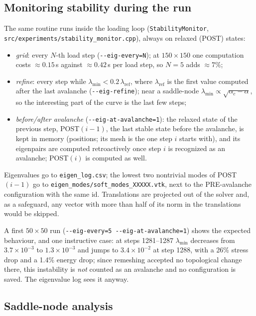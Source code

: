 \documentclass[11pt,a4paper]{article}
\theoremstyle{remark}
\newcommand{\code}[1]{\texttt{#1}}
\begin{document}
\subsection{Monitoring stability during the run}

The same routine runs inside the loading loop (\code{StabilityMonitor},
\code{src/\allowbreak{}experiments/\allowbreak{}stability\_\allowbreak{}monitor.cpp}), always on relaxed (POST) states:
\begin{itemize}[leftmargin=*]
\item \emph{grid}: every $N$-th load step (\code{-{}-eig-every=N}); at $150\times150$ one computation
costs $\approx0.15$\,s against $\approx0.42$\,s per load step, so $N=5$ adds $\approx7\%$;
\item \emph{refine}: every step while $\lambda_{\min}<0.2\,\lambda_{\mathrm{ref}}$, where
$\lambda_{\mathrm{ref}}$ is the first value computed after the last avalanche
(\code{-{}-eig-refine}); near a saddle-node $\lambda_{\min}\propto\sqrt{\alpha_c-\alpha}$, so the
interesting part of the curve is the last few steps;
\item \emph{before/after avalanche} (\code{-{}-eig-at-avalanche=1}): the relaxed state of the
previous step, POST$(i-1)$, the last stable state before the avalanche, is kept in memory
(positions; its mesh is the one step $i$ starts with), and its eigenpairs are computed
retroactively once step $i$ is recognized as an avalanche; POST$(i)$ is computed as well.
\end{itemize}
Eigenvalues go to \code{eigen\_\allowbreak{}log.csv}; the lowest two nontrivial modes of POST$(i-1)$
go to \code{eigen\_\allowbreak{}modes/\allowbreak{}soft\_\allowbreak{}modes\_XXXXX.vtk}, next to the PRE-avalanche
configuration with the same id. Translations are projected out of the solver and, as a
safeguard, any vector with more than half of its norm in the translations would be skipped.

A first $50\times50$ run (\code{-{}-eig-every=5 -{}-eig-at-avalanche=1}) shows the expected
behaviour, and one instructive case: at steps 1281--1287 $\lambda_{\min}$ decreases from
$3.7\times10^{-3}$ to $1.3\times10^{-3}$ and jumps to $3.4\times10^{-2}$ at step 1288, with a 26\%
stress drop and a 1.4\% energy drop; since remeshing accepted no topological change there,
this instability is \emph{not} counted as an avalanche and no configuration is saved. The
eigenvalue log sees it anyway.

\subsection{Saddle-node analysis}
\end{document}
